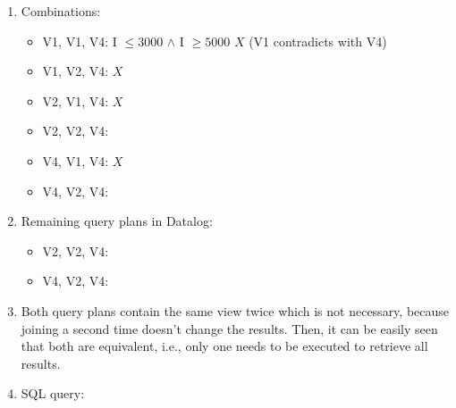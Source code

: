 \documentclass{scrartcl}
\begin{document}
\begin{enumerate}
		\item Combinations:
		\begin{itemize}
			\item V1, V1, V4: I $\leq 3000$ $\wedge$ I $\geq 5000$ $X$ (V1 contradicts with V4)
			\item V1, V2, V4: $X$
			\item V2, V1, V4: $X$
			\item V2, V2, V4:
			\item V4, V1, V4: $X$
			\item V4, V2, V4:
		\end{itemize}
		
		\item Remaining query plans in Datalog:
		\begin{itemize}
			\item V2, V2, V4:
			\begin{center}
			\end{center}
			
			\item V4, V2, V4:
			\begin{center}
			\end{center}
		\end{itemize}
		\item
		Both query plans contain the same view twice which is not necessary, because joining a second time doesn't change the results.
		Then, it can be easily seen that both are equivalent, i.e., only one needs to be executed to retrieve all results.
		
		\item SQL query:
		\begin{center}
		\end{center}
	\end{enumerate}
	
\end{document}
